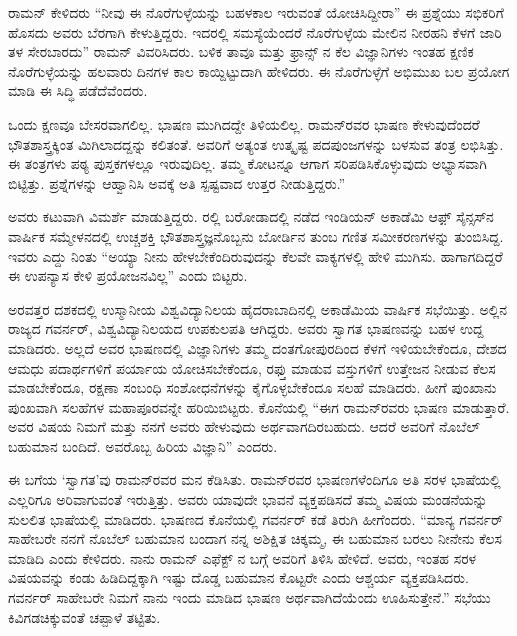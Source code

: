 ರಾಮನ್ ಕೇಳಿದರು  “ನೀವು ಈ ನೊರೆಗುಳ್ಳೆಯನ್ನು ಬಹಳಕಾಲ ಇರುವಂತೆ ಯೋಚಿಸಿದ್ದೀರಾ” ಈ ಪ್ರಶ್ನೆಯು ಸಭಿಕರಿಗೆ ಹೊಸದು ಅವರು ಬೆರಗಾಗಿ ಕೇಳುತ್ತಿದ್ದರು. ಇದರಲ್ಲಿ ಸಮಸ್ಯೆಯೆಂದರೆ ನೊರೆಗುಳ್ಳೆಯ ಮೇಲಿನ ನೀರಹನಿ ಕೆಳಗೆ ಜಾರಿ ತಳ ಸೇರಬಾರದು” \enginline{--}ರಾಮನ್ ವಿವರಿಸಿದರು. ಬಳಿಕ ತಾವೂ ಮತ್ತು ಫ್ರಾನ್ಸ್ ನ ಕೆಲ ವಿಜ್ಞಾನಿಗಳು ಇಂತಹ ಕ್ಷಣಿಕ ನೊರೆಗುಳ್ಳೆಯನ್ನು ಹಲವಾರು ದಿನಗಳ ಕಾಲ ಕಾಯ್ದಿಟ್ಟುದಾಗಿ ಹೇಳಿದರು. ಈ ನೊರೆಗುಳ್ಳೆಗೆ ಅಭಿಮುಖ ಬಲ ಪ್ರಯೋಗ ಮಾಡಿ ಈ ಸಿದ್ಧಿ ಪಡೆದೆವೆಂದರು.

ಒಂದು ಕ್ಷಣವೂ ಬೇಸರವಾಗಲಿಲ್ಲ. ಭಾಷಣ ಮುಗಿದದ್ದೇ ತಿಳಿಯಲಿಲ್ಲ. ರಾಮನ್‍ರವರ ಭಾಷಣ ಕೇಳುವುದೆಂದರೆ ಭೌತಶಾಸ್ತ್ರಕ್ಕಿಂತ ಮಿಗಿಲಾದದ್ದನ್ನು ಕಲಿತಂತೆ. ಅವರಿಗೆ ಅತ್ಯಂತ ಉತ್ಕೃಷ್ಟ ಪದಪುಂಜಗಳನ್ನು ಬಳಸುವ ತಂತ್ರ ಲಭಿಸಿತ್ತು. ಈ ತಂತ್ರಗಳು ಪಠ್ಯ ಪುಸ್ತಕಗಳಲ್ಲೂ ಇರುವುದಿಲ್ಲ. ತಮ್ಮ ಕೋಟನ್ನೂ ಆಗಾಗ ಸರಿಪಡಿಸಿಕೊಳ್ಳುವುದು ಅಭ್ಯಾಸವಾಗಿ ಬಿಟ್ಟಿತ್ತು. ಪ್ರಶ್ನೆಗಳನ್ನು ಆಹ್ವಾನಿಸಿ ಅವಕ್ಕೆ ಅತಿ ಸ್ಪಷ್ಟವಾದ ಉತ್ತರ ನೀಡುತ್ತಿದ್ದರು.”

ಅವರು ಕಟುವಾಗಿ ವಿಮರ್ಶೆ ಮಾಡುತ್ತಿದ್ದರು. ರಲ್ಲಿ ಬರೋಡಾದಲ್ಲಿ ನಡೆದ ಇಂಡಿಯನ್ ಅಕಾಡೆಮಿ ಆಫ಼್ ಸೈನ್ಸಸ್‍ನ ವಾರ್ಷಿಕ ಸಮ್ಮೇಳನದಲ್ಲಿ ಉಚ್ಚಶಕ್ತಿ ಭೌತಶಾಸ್ತ್ರಜ್ಞನೊಬ್ಬನು ಬೋರ್ಡಿನ ತುಂಬ ಗಣಿತ ಸಮೀಕರಣಗಳನ್ನು ತುಂಬಿಸಿದ್ದ. ಇವರು ಎದ್ದು ನಿಂತು “ಅಯ್ಯಾ ನೀನು ಹೇಳಬೇಕೆಂದಿರುವುದನ್ನು ಕೆಲವೇ ವಾಕ್ಯಗಳಲ್ಲಿ ಹೇಳಿ ಮುಗಿಸು. ಹಾಗಾಗದಿದ್ದರೆ ಈ ಉಪನ್ಯಾಸ ಕೇಳಿ ಪ್ರಯೋಜನವಿಲ್ಲ” ಎಂದು ಬಿಟ್ಟರು.

\newpage

ಅರವತ್ತರ ದಶಕದಲ್ಲಿ ಉಸ್ಮಾನೀಯ ವಿಶ್ವವಿದ್ಯಾನಿಲಯ ಹೈದರಾಬಾದಿನಲ್ಲಿ ಅಕಾಡೆಮಿಯ ವಾರ್ಷಿಕ ಸಭೆಯಿತ್ತು. ಅಲ್ಲಿನ ರಾಜ್ಯದ ಗವರ್ನರ್, ವಿಶ್ವವಿದ್ಯಾನಿಲಯದ ಉಪಕುಲಪತಿ ಆಗಿದ್ದರು. ಅವರು ಸ್ವಾಗತ ಭಾಷಣವನ್ನು ಬಹಳ ಉದ್ದ ಮಾಡಿದರು. ಅಲ್ಲದೆ ಅವರ ಭಾಷಣದಲ್ಲಿ ವಿಜ್ಞಾನಿಗಳು ತಮ್ಮ ದಂತಗೋಪುರದಿಂದ ಕೆಳಗೆ ಇಳಿಯಬೇಕೆಂದೂ, ದೇಶದ ಆಮಧು ಪದಾರ್ಥಗಳಿಗೆ ಪರ್ಯಾಯ ಯೋಚಿಸಬೇಕೆಂದೂ, ರಫ್ತು ಮಾಡುವ ವಸ್ತುಗಳಿಗೆ ಉತ್ತೇಜನ ನೀಡುವ ಕೆಲಸ ಮಾಡಬೇಕೆಂದೂ, ರಕ್ಷಣಾ ಸಂಬಂಧಿ ಸಂಶೋಧನೆಗಳನ್ನು ಕೈಗೊಳ್ಳಬೇಕೆಂದೂ ಸಲಹೆ ಮಾಡಿದರು. ಹೀಗೆ ಪುಂಖಾನು ಪುಂಖವಾಗಿ ಸಲಹೆಗಳ ಮಹಾಪೂರವನ್ನೇ ಹರಿಯಿಬಿಟ್ಟರು. ಕೊನೆಯಲ್ಲಿ “ಈಗ ರಾಮನ್‍ರವರು ಭಾಷಣ ಮಾಡುತ್ತಾರೆ. ಅವರ ವಿಷಯ \textit{} ನಿಮಗೆ ಮತ್ತು ನನಗೆ ಅವರು ಹೇಳುವುದು ಅರ್ಥವಾಗದಿರಬಹುದು. ಆದರೆ ಅವರಿಗೆ ನೊಬೆಲ್ ಬಹುಮಾನ ಬಂದಿದೆ. ಅವರೊಬ್ಬ ಹಿರಿಯ ವಿಜ್ಞಾನಿ” ಎಂದರು.

ಈ ಬಗೆಯ ‘ಸ್ವಾಗತ’ವು ರಾಮನ್‍ರವರ ಮನ ಕೆಡಿಸಿತು. ರಾಮನ್‍ರವರ ಭಾಷಣಗಳೆಂದಿಗೂ ಅತಿ ಸರಳ ಭಾಷೆಯಲ್ಲಿ ಎಲ್ಲರಿಗೂ ಅರಿವಾಗುವಂತೆ ಇರುತ್ತಿತ್ತು. ಅವರು ಯಾವುದೇ ಭಾವನೆ ವ್ಯಕ್ತಪಡಿಸದೆ ತಮ್ಮ ವಿಷಯ ಮಂಡನೆಯನ್ನು ಸುಲಲಿತ ಭಾಷೆಯಲ್ಲಿ ಮಾಡಿದರು. ಭಾಷಣದ ಕೊನೆಯಲ್ಲಿ ಗವರ್ನರ್ ಕಡೆ ತಿರುಗಿ ಹೀಗೆಂದರು. “ಮಾನ್ಯ ಗವರ್ನರ್ ಸಾಹೇಬರೇ ನನಗೆ ನೊಬೆಲ್ ಬಹುಮಾನ ಬಂದಾಗ ನನ್ನ ಅಶಿಕ್ಷಿತ ಚಿಕ್ಕಮ್ಮ, ಈ ಬಹುಮಾನ ಬರಲು ನೀನೇನು ಕೆಲಸ ಮಾಡಿದಿ ಎಂದು ಕೇಳಿದರು. ನಾನು ರಾಮನ್ ಎಫೆಕ್ಟ್ ನ ಬಗ್ಗೆ ಅವರಿಗೆ ತಿಳಿಸಿ ಹೇಳಿದೆ. ಅವರು, ಇಂತಹ ಸರಳ ವಿಷಯವನ್ನು ಕಂಡು ಹಿಡಿದಿದ್ದಕ್ಕಾಗಿ ಇಷ್ಟು ದೊಡ್ಡ ಬಹುಮಾನ ಕೊಟ್ಟರೇ ಎಂದು ಆಶ್ಚರ್ಯ ವ್ಯಕ್ತಪಡಿಸಿದರು. ಗವರ್ನರ್ ಸಾಹೇಬರೇ ನಿಮಗೆ ನಾನು ಇಂದು ಮಾಡಿದ ಭಾಷಣ ಅರ್ಥವಾಗಿದೆಯೆಂದು ಊಹಿಸುತ್ತೇನೆ.” ಸಭೆಯು ಕಿವಿಗಡಚಿಕ್ಕುವಂತೆ ಚಪ್ಪಾಳೆ ತಟ್ಟಿತು.

